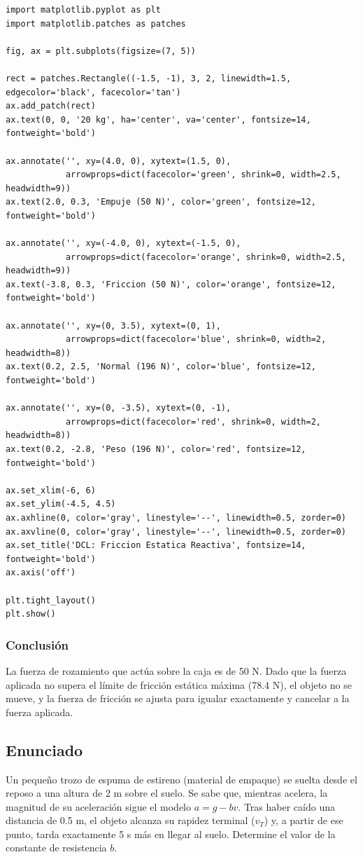 \documentclass[12pt]{article}
\begin{document}
\begin{lstlisting}
import matplotlib.pyplot as plt
import matplotlib.patches as patches

fig, ax = plt.subplots(figsize=(7, 5))

rect = patches.Rectangle((-1.5, -1), 3, 2, linewidth=1.5, edgecolor='black', facecolor='tan')
ax.add_patch(rect)
ax.text(0, 0, '20 kg', ha='center', va='center', fontsize=14, fontweight='bold')

ax.annotate('', xy=(4.0, 0), xytext=(1.5, 0), 
            arrowprops=dict(facecolor='green', shrink=0, width=2.5, headwidth=9))
ax.text(2.0, 0.3, 'Empuje (50 N)', color='green', fontsize=12, fontweight='bold')

ax.annotate('', xy=(-4.0, 0), xytext=(-1.5, 0), 
            arrowprops=dict(facecolor='orange', shrink=0, width=2.5, headwidth=9))
ax.text(-3.8, 0.3, 'Friccion (50 N)', color='orange', fontsize=12, fontweight='bold')

ax.annotate('', xy=(0, 3.5), xytext=(0, 1), 
            arrowprops=dict(facecolor='blue', shrink=0, width=2, headwidth=8))
ax.text(0.2, 2.5, 'Normal (196 N)', color='blue', fontsize=12, fontweight='bold')

ax.annotate('', xy=(0, -3.5), xytext=(0, -1), 
            arrowprops=dict(facecolor='red', shrink=0, width=2, headwidth=8))
ax.text(0.2, -2.8, 'Peso (196 N)', color='red', fontsize=12, fontweight='bold')

ax.set_xlim(-6, 6)
ax.set_ylim(-4.5, 4.5)
ax.axhline(0, color='gray', linestyle='--', linewidth=0.5, zorder=0)
ax.axvline(0, color='gray', linestyle='--', linewidth=0.5, zorder=0)
ax.set_title('DCL: Friccion Estatica Reactiva', fontsize=14, fontweight='bold')
ax.axis('off')

plt.tight_layout()
plt.show()
\end{lstlisting}

\subsubsection*{Conclusión}
La fuerza de rozamiento que actúa sobre la caja es de 50 N. Dado que la fuerza aplicada no supera el límite de fricción estática máxima (78.4 N), el objeto no se mueve, y la fuerza de fricción se ajusta para igualar exactamente y cancelar a la fuerza aplicada.

\newpage

\subsection*{Enunciado}
Un pequeño trozo de espuma de estireno (material de empaque) se suelta desde el reposo a una altura de 2 m sobre el suelo. Se sabe que, mientras acelera, la magnitud de su aceleración sigue el modelo $a = g - bv$. Tras haber caído una distancia de 0.5 m, el objeto alcanza su rapidez terminal ($v_T$) y, a partir de ese punto, tarda exactamente 5 s más en llegar al suelo. Determine el valor de la constante de resistencia $b$.
\end{document}
